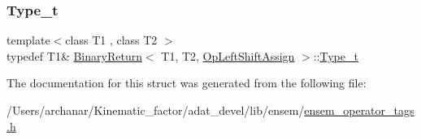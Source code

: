 \mbox{\label{structBinaryReturn_3_01T1_00_01T2_00_01OpLeftShiftAssign_01_4_a7d79a1ecfbc2faf0748a47701eee12af}} 
\subsubsection{\texorpdfstring{Type\_t}{Type\_t}\hspace{0.1cm}{\footnotesize\ttfamily [2/2]}}
{\footnotesize\ttfamily template$<$class T1 , class T2 $>$ \\
typedef T1\& \mbox{\hyperlink{structBinaryReturn}{Binary\+Return}}$<$ T1, T2, \mbox{\hyperlink{structOpLeftShiftAssign}{Op\+Left\+Shift\+Assign}} $>$\+::\mbox{\hyperlink{structBinaryReturn_3_01T1_00_01T2_00_01OpLeftShiftAssign_01_4_a7d79a1ecfbc2faf0748a47701eee12af}{Type\+\_\+t}}}



The documentation for this struct was generated from the following file\+:\begin{DoxyCompactItemize}
\item 
/\+Users/archanar/\+Kinematic\+\_\+factor/adat\+\_\+devel/lib/ensem/\mbox{\hyperlink{lib_2ensem_2ensem__operator__tags_8h}{ensem\+\_\+operator\+\_\+tags.\+h}}\end{DoxyCompactItemize}
